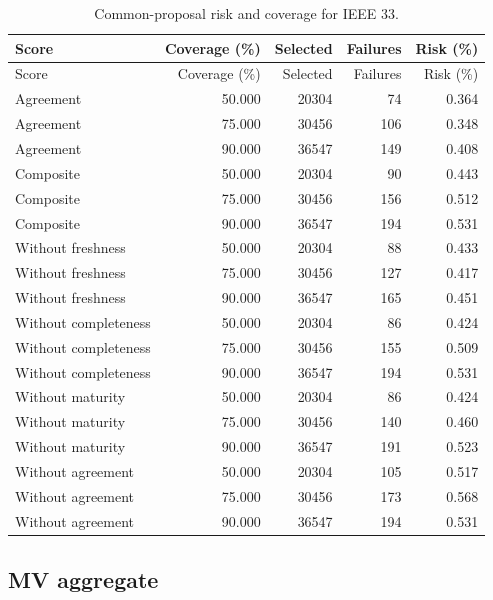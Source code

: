 \documentclass[11pt]{article}
\begin{document}
\small\begin{longtable}{lrrrr}
\caption{Common-proposal risk and coverage for IEEE 33.}\\\toprule
Score & Coverage (\%) & Selected & Failures & Risk (\%)\\\midrule
\endfirsthead
\toprule
Score & Coverage (\%) & Selected & Failures & Risk (\%)\\\midrule
\endhead
\bottomrule\endfoot
Agreement & 50.000 & 20304 & 74 & 0.364\\
Agreement & 75.000 & 30456 & 106 & 0.348\\
Agreement & 90.000 & 36547 & 149 & 0.408\\
Composite & 50.000 & 20304 & 90 & 0.443\\
Composite & 75.000 & 30456 & 156 & 0.512\\
Composite & 90.000 & 36547 & 194 & 0.531\\
Without freshness & 50.000 & 20304 & 88 & 0.433\\
Without freshness & 75.000 & 30456 & 127 & 0.417\\
Without freshness & 90.000 & 36547 & 165 & 0.451\\
Without completeness & 50.000 & 20304 & 86 & 0.424\\
Without completeness & 75.000 & 30456 & 155 & 0.509\\
Without completeness & 90.000 & 36547 & 194 & 0.531\\
Without maturity & 50.000 & 20304 & 86 & 0.424\\
Without maturity & 75.000 & 30456 & 140 & 0.460\\
Without maturity & 90.000 & 36547 & 191 & 0.523\\
Without agreement & 50.000 & 20304 & 105 & 0.517\\
Without agreement & 75.000 & 30456 & 173 & 0.568\\
Without agreement & 90.000 & 36547 & 194 & 0.531\\
\end{longtable}\normalsize
{}\subsection{MV aggregate}
\end{document}
